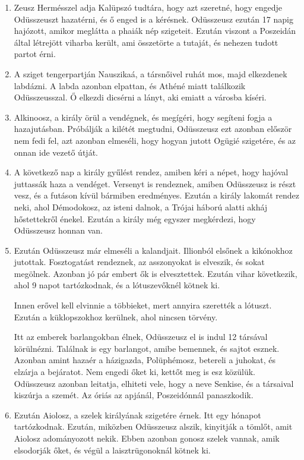 \documentclass[]{article}
\begin{document}
\begin{enumerate}
				\item Zeusz Hermésszel adja Kalüpszó tudtára, hogy azt szeretné, hogy engedje Odüsszeuszt hazatérni, és ő enged is a kérésnek. Odüsszeusz ezután 17 napig hajózott, amikor meglátta a phaiák nép szigeteit. Ezután viszont a Poszeidán által létrejött viharba került, ami összetörte a tutaját, és nehezen tudott partot érni.
				
				\item A sziget tengerpartján Nauszikaá, a társnőivel ruhát mos, majd elkezdenek labdázni. A labda azonban elpattan, és Athéné miatt találkozik Odüsszeusszal. Ő elkezdi dicsérni a lányt, aki emiatt a városba kíséri.
				
				\item Alkinoosz, a király örül a vendégnek, és megígéri, hogy segíteni fogja a hazajutásban. Próbálják a kilétét megtudni, Odüsszeusz ezt azonban először nem fedi fel, azt azonban elmeséli, hogy hogyan jutott Ogügié szigetére, és az onnan ide vezető útját.
				
				\item A következő nap a király gyűlést rendez, amiben kéri a népet, hogy hajóval juttassák haza a vendéget. Versenyt is rendeznek, amiben Odüsszeusz is részt vesz, és a futáson kívül bármiben eredményes. Ezután a király lakomát rendez neki, ahol Démodokosz, az isteni dalnok, a Trójai háború alatti akháj hőstettekről énekel. Ezután a király még egyszer megkérdezi, hogy Odüsszeusz honnan van.
				
				\item Ezután Odüsszeusz már elmeséli a kalandjait. Illionból elsőnek a kikónokhoz jutottak. Fosztogatást rendeznek, az asszonyokat is elveszik, és sokat megölnek. Azonban jó pár embert ők is elvesztettek. Ezután vihar következik, ahol 9 napot tartózkodnak, és a lótuszevőknél kötnek ki.
				
				Innen erővel kell elvinnie a többieket, mert annyira szerették a lótuszt. Ezután a küklopszokhoz kerülnek, ahol nincsen törvény.
				
				Itt az emberek barlangokban élnek, Odüsszeusz el is indul 12 társával körülnézni. Találnak is egy barlangot, amibe bemennek, és sajtot esznek. Azonban amint hazaér a házigazda, Polüphémosz, betereli a juhokat, és elzárja a bejáratot. Nem engedi őket ki, kettőt meg is esz közülük. Odüsszeusz azonban leitatja, elhiteti vele, hogy a neve Senkise, és a társaival kiszúrja a szemét. Az óriás az apjánál, Poszeidónnál panaszkodik.
				
				\item Ezután Aiolosz, a szelek királyának szigetére érnek. Itt egy hónapot tartózkodnak. Ezután, miközben Odüsszeusz alszik, kinyitják a tömlőt, amit Aiolosz adományozott nekik. Ebben azonban gonosz szelek vannak, amik elsodorják őket, és végül a laisztrügonoknál kötnek ki.
				

\end{enumerate}
\end{document}
